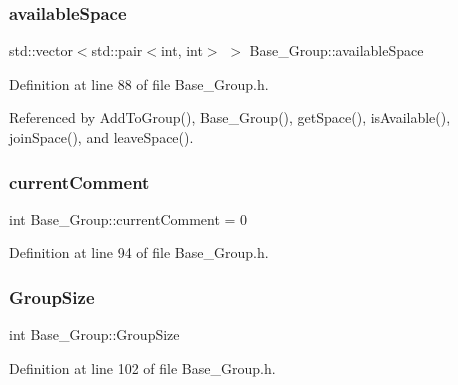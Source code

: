 \subsubsection{\texorpdfstring{available\+Space}{availableSpace}}
{\footnotesize\ttfamily std\+::vector$<$std\+::pair$<$int, int$>$ $>$ Base\+\_\+\+Group\+::available\+Space\hspace{0.3cm}{\ttfamily [private]}}



Definition at line 88 of file Base\+\_\+\+Group.\+h.



Referenced by Add\+To\+Group(), Base\+\_\+\+Group(), get\+Space(), is\+Available(), join\+Space(), and leave\+Space().

\mbox{\label{class_base___group_a9e1cd9c58ee0f2a67c3df992a553d625}} 
\subsubsection{\texorpdfstring{current\+Comment}{currentComment}}
{\footnotesize\ttfamily int Base\+\_\+\+Group\+::current\+Comment = 0\hspace{0.3cm}{\ttfamily [private]}}



Definition at line 94 of file Base\+\_\+\+Group.\+h.

\mbox{\label{class_base___group_a44130e3b109f8fb9fb0142fda2a67b07}} 
\subsubsection{\texorpdfstring{Group\+Size}{GroupSize}}
{\footnotesize\ttfamily int Base\+\_\+\+Group\+::\+Group\+Size\hspace{0.3cm}{\ttfamily [private]}}



Definition at line 102 of file Base\+\_\+\+Group.\+h.

\mbox{\label{class_base___group_a039388ca2feb6e676829839d9a3ff543}} 
